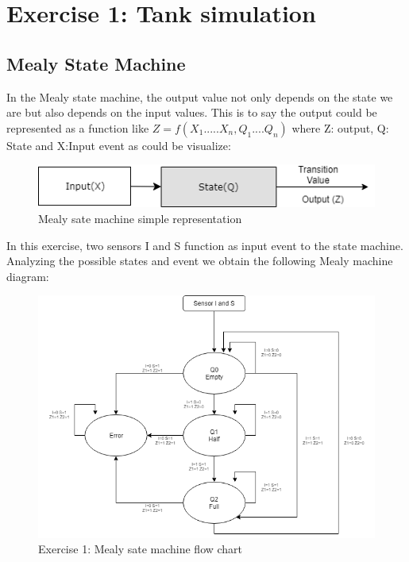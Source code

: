 



%
%
%

\section{\color{olive}Exercise 1: Tank simulation}

\subsection{\color{purple}Mealy State Machine}

In the Mealy state machine, the output value not only depends on the state we are but also depends on the input values. This is to say the output could be represented as a function like $Z=f(X_1.....X_n,Q_1....Q_n)$ where Z: output, Q: State and X:Input event as could be visualize:

 \begin{figure}[h!]
        \centering
        \includegraphics[scale=0.75]{Mealydiagram.png}
        \caption{\color{cyan}Mealy sate machine simple representation}
        \label{fig:ej1mealyr}
    \end{figure}

In this exercise, two sensors I and S function as input event to the state machine. Analyzing the possible states and event we obtain the following Mealy machine diagram:

 \begin{figure}[h!]
        \centering
        \includegraphics[scale=0.65]{ej1mealy.png}
        \caption{\color{cyan}Exercise 1: Mealy sate machine flow chart}
        \label{fig:ej1mealyd}
    \end{figure}

